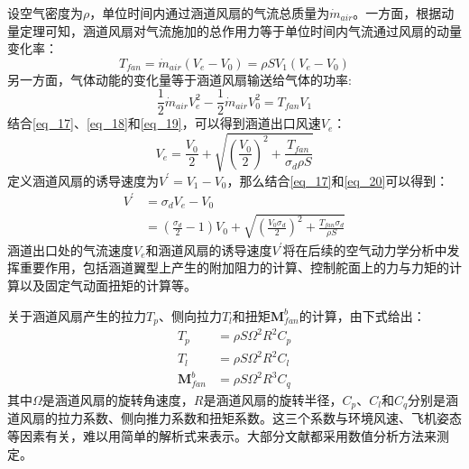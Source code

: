 设空气密度为$\rho$，单位时间内通过涵道风扇的气流总质量为$\dot{m}_{air}$。一方面，根据动量定理可知，涵道风扇对气流施加的总作用力等于单位时间内气流通过风扇的动量变化率：
\begin{equation}
    T_{fan}=\dot{m}_{air}(V_e-V_0)=\rho S V_1(V_e-V_0)
    \label{eq_18}
\end{equation}
另一方面，气体动能的变化量等于涵道风扇输送给气体的功率:
\begin{equation}
    \frac{1}{2}\dot{m}_{air}V_e^2-\frac{1}{2}\dot{m}_{air}V_0^2=T_{fan}V_1
    \label{eq_19}
\end{equation}
结合\eqref{eq_17}、\eqref{eq_18}和\eqref{eq_19}，可以得到涵道出口风速$V_e$\cite{pereiraHoverWindtunnelTesting2008}：
\begin{equation}
    V_e=\frac{V_0}{2}+\sqrt{\left(\frac{V_0}{2}\right)^2+\frac{T_{fan}}{\sigma_d\rho S}}    \label{eq_20}
\end{equation}
定义涵道风扇的诱导速度为$V^{\prime}=V_1-V_0$，那么结合\eqref{eq_17}和\eqref{eq_20}可以得到：
\begin{equation}
    \begin{aligned}
    V^{\prime}&=\sigma_dV_e-V_0 \\
    &=\left(\frac{\sigma_d}{2}-1\right)V_0+\sqrt{\left(\frac{V_0\sigma_d}{2}\right)^2+\frac{T_{fan}\sigma_d}{\rho S}}
    \label{induced velocity}
    \end{aligned}
\end{equation}
涵道出口处的气流速度$V_e$和涵道风扇的诱导速度$V^{\prime}$将在后续的空气动力学分析中发挥重要作用，包括涵道翼型上产生的附加阻力的计算、控制舵面上的力与力矩的计算以及固定气动面扭矩的计算等。

关于涵道风扇产生的拉力$T_{p}$、侧向拉力$T_{l}$和扭矩$\boldsymbol{M}_{fan}^b$的计算，由下式给出\cite{luoNumericalAnalysisWind2024a}：
\begin{equation}
    \begin{aligned}
        T_{p}&=\rho S \Omega^2R^2 C_{p}\\
        T_{l}&=\rho S \Omega^2R^2 C_{l}\\
        \boldsymbol{M}_{fan}^b&=\rho S \Omega^2 R^3C_{q}
    \end{aligned}
    \label{eq_21}
\end{equation}
其中$\Omega$是涵道风扇的旋转角速度，$R$是涵道风扇的旋转半径，$C_{p}$、$C_{l}$和$C_{q}$分别是涵道风扇的拉力系数、侧向推力系数和扭矩系数。这三个系数与环境风速、飞机姿态等因素有关，难以用简单的解析式来表示。大部分文献都采用数值分析方法来测定\cite{ohanian2012nondimensional,choiStaticAnalysisSmall2012,luoNumericalAnalysisWind2024a}。

